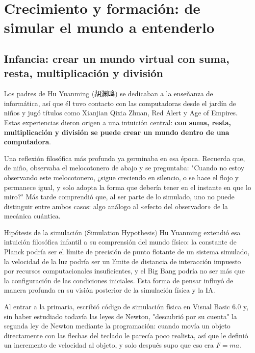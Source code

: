 \documentclass[a4paper]{article}
\begin{document}
\section{Crecimiento y formación: de simular el mundo a entenderlo}

\subsection{Infancia: crear un mundo virtual con suma, resta, multiplicación y división}

Los padres de Hu Yuanming (胡渊鸣) se dedicaban a la enseñanza de informática, así que él tuvo contacto con las computadoras desde el jardín de niños y jugó títulos como Xianjian Qixia Zhuan, Red Alert y Age of Empires. Estas experiencias dieron origen a una intuición central: \textbf{con suma, resta, multiplicación y división se puede crear un mundo dentro de una computadora}.

Una reflexión filosófica más profunda ya germinaba en esa época. Recuerda que, de niño, observaba el melocotonero de abajo y se preguntaba: "Cuando no estoy observando este melocotonero, ¿sigue creciendo en silencio, o se hace el flojo y permanece igual, y solo adopta la forma que debería tener en el instante en que lo miro?" Más tarde comprendió que, al ser parte de lo simulado, uno no puede distinguir entre ambos casos: algo análogo al «efecto del observador» de la mecánica cuántica.

\begin{knowledgebox}{Hipótesis de la simulación (Simulation Hypothesis)}
Hu Yuanming extendió esa intuición filosófica infantil a su comprensión del mundo físico: la constante de Planck podría ser el límite de precisión de punto flotante de un sistema simulado, la velocidad de la luz podría ser un límite de distancia de interacción impuesto por recursos computacionales insuficientes, y el Big Bang podría no ser más que la configuración de las condiciones iniciales. Esta forma de pensar influyó de manera profunda en su visión posterior de la simulación física y la IA.
\end{knowledgebox}

Al entrar a la primaria, escribió código de simulación física en Visual Basic 6.0 y, sin haber estudiado todavía las leyes de Newton, "descubrió por su cuenta" la segunda ley de Newton mediante la programación: cuando movía un objeto directamente con las flechas del teclado le parecía poco realista, así que le definió un incremento de velocidad al objeto, y solo después supo que eso era $F = ma$.
\end{document}
